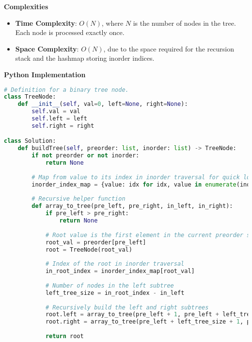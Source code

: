 \textbf{Complexities}

\begin{itemize}
    \item \textbf{Time Complexity}: \(O(N)\), where \(N\) is the number of nodes in the tree. Each node is processed exactly once.
    \item \textbf{Space Complexity}: \(O(N)\), due to the space required for the recursion stack and the hashmap storing inorder indices.
\end{itemize}

\textbf{Python Implementation}

\begin{lstlisting}[language=Python, xleftmargin=0.02\textwidth, xrightmargin=0.02\textwidth]
# Definition for a binary tree node.
class TreeNode:
    def __init__(self, val=0, left=None, right=None):
        self.val = val
        self.left = left
        self.right = right

class Solution:
    def buildTree(self, preorder: list, inorder: list) -> TreeNode:
        if not preorder or not inorder:
            return None
        
        # Map from value to its index in inorder traversal for quick lookup
        inorder_index_map = {value: idx for idx, value in enumerate(inorder)}
        
        # Recursive helper function
        def array_to_tree(pre_left, pre_right, in_left, in_right):
            if pre_left > pre_right:
                return None
            
            # Root value is the first element in the current preorder slice
            root_val = preorder[pre_left]
            root = TreeNode(root_val)
            
            # Index of the root in inorder traversal
            in_root_index = inorder_index_map[root_val]
            
            # Number of nodes in the left subtree
            left_tree_size = in_root_index - in_left
            
            # Recursively build the left and right subtrees
            root.left = array_to_tree(pre_left + 1, pre_left + left_tree_size, in_left, in_root_index - 1)
            root.right = array_to_tree(pre_left + left_tree_size + 1, pre_right, in_root_index + 1, in_right)
            
            return root
        

\end{lstlisting}
